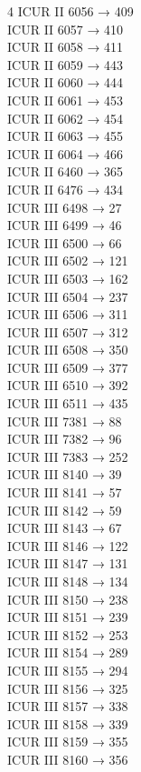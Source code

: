 \begin{multicols}{4}
ICUR II 6056 → 409\\
ICUR II 6057 → 410\\
ICUR II 6058 → 411\\
ICUR II 6059 → 443\\
ICUR II 6060 → 444\\
ICUR II 6061 → 453\\
ICUR II 6062 → 454\\
ICUR II 6063 → 455\\
ICUR II 6064 → 466\\
ICUR II 6460 → 365\\
ICUR II 6476 → 434\\
ICUR III 6498 → 27\\
ICUR III 6499 → 46\\
ICUR III 6500 → 66\\
ICUR III 6502 → 121\\
ICUR III 6503 → 162\\
ICUR III 6504 → 237\\
ICUR III 6506 → 311\\
ICUR III 6507 → 312\\
ICUR III 6508 → 350\\
ICUR III 6509 → 377\\
ICUR III 6510 → 392\\
ICUR III 6511 → 435\\
ICUR III 7381 → 88\\
ICUR III 7382 → 96\\
ICUR III 7383 → 252\\
ICUR III 8140 → 39\\
ICUR III 8141 → 57\\
ICUR III 8142 → 59\\
ICUR III 8143 → 67\\
ICUR III 8146 → 122\\
ICUR III 8147 → 131\\
ICUR III 8148 → 134\\
ICUR III 8150 → 238\\
ICUR III 8151 → 239\\
ICUR III 8152 → 253\\
ICUR III 8154 → 289\\
ICUR III 8155 → 294\\
ICUR III 8156 → 325\\
ICUR III 8157 → 338\\
ICUR III 8158 → 339\\
ICUR III 8159 → 355\\
ICUR III 8160 → 356\\

\end{multicols}
